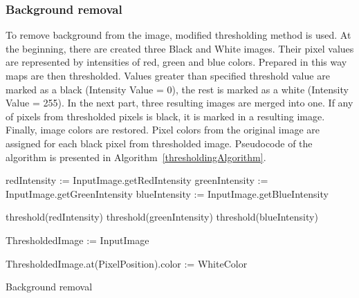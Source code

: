 \documentclass[a4paper,onecolumn,oneside,12pt]{memoir}
\begin{document}
\subsubsection{Background removal}

To remove background from the image, modified thresholding method is used. At the beginning, there
are created three Black and White images. Their pixel values are represented by intensities of red,
green and blue colors. Prepared in this way maps are then thresholded. Values greater than specified
threshold value are marked as a black (Intensity Value = 0), the rest is marked as a white (Intensity
Value = 255). In the next part, three resulting images are merged into one. If any of pixels from
thresholded pixels is black, it is marked in a resulting image. Finally, image colors are restored.
Pixel colors from the original image are assigned for each black pixel from thresholded image.
Pseudocode of the algorithm is presented in Algorithm~\ref{thresholdingAlgorithm}.

\begin{algorithm}[!ht]

  redIntensity := InputImage.getRedIntensity\;
  greenIntensity := InputImage.getGreenIntensity\;
  blueIntensity := InputImage.getBlueIntensity\;

  threshold(redIntensity)\;
  threshold(greenIntensity)\;
  threshold(blueIntensity)\;

  ThresholdedImage := InputImage\;

  {
    {
      ThresholdedImage.at(PixelPosition).color := WhiteColor\;
    }
  }


  \caption{Background removal}
  \label{thresholdingAlgorithm}
\end{algorithm}
\end{document}
